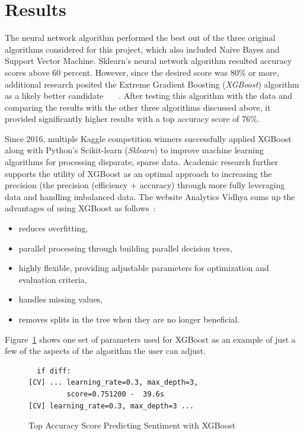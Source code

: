 \section{Results}

The neural network algorithm performed the best out of the three
original algorithms considered for this project, which also included
Naive Bayes and Support Vector Machine.  Sklearn's neural network
algorithm resulted accuracy scores above 60 percent.  However, since
the desired score was 80\% or more, additional research posited the
Extreme Gradient Boosting (\emph{XGBoost}) algorithm as a likely
better candidate~\cite{Chen2016} ~\cite{baba2016}~\cite{phunter2016}.
After testing this algorithm with the data and comparing the results
with the other three algorithms discussed above, it provided
significantly higher results with a top accuracy score of 76\%.

Since 2016, multiple Kaggle competition winners successfully applied
XGBoost along with Python’s Scikit-learn (\emph{Sklearn}) to improve
machine learning algorithms for processing disparate, sparse data.
Academic research further supports the utility of XGBoost as an
optimal approach to increasing the precision (the precision
(efficiency + accuracy) through more fully leveraging data and
handling imbalanced data.  The website Analytics Vidhya sums up the
advantages of using XGBoost as follows~\cite{jain2016}:

\begin{itemize}
\item reduces overfitting,
\item parallel processing through building parallel decision trees,
\item highly flexible, providing adjustable parameters for
  optimization and evaluation criteria,
\item handles missing values,
\item removes splits in the tree when they are no longer beneficial. 
\end{itemize}

Figure~\ref{F:output} shows one set of parameters used for XGBoost as
an example of just a few of the aspects of the algorithm the user can
adjust.

\begin{figure}[H]
\begin{verbatim}
  if diff:
[CV] ... learning_rate=0.3, max_depth=3, 
         score=0.751200 -  39.6s
[CV] learning_rate=0.3, max_depth=3 ...
\end{verbatim}
\caption{Top Accuracy Score Predicting Sentiment with XGBoost}\label{F:output}
\end{figure}

